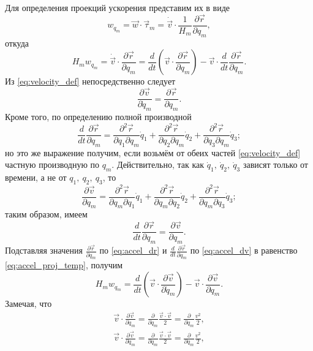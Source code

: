 \documentclass{article}
\theoremstyle{definition}
\theoremstyle{plain}
\theoremstyle{remark}
\numberwithin{equation}{section}
\newcommand{\paren}[1]{\left( #1 \right)}
\newcommand{\dotprod}[2]{#1 \cdot #2}
\newcommand{\der}[2][]{\frac{d #1}{d #2}}
\newcommand{\parder}[2][]{\frac{\partial #1}{\partial #2}}
\newcommand{\pparder}[3][]{\frac{\partial^2 #1}{\partial #2 \partial #3}}
\newcommand{\dt}[1][]{\der[#1]{t}}
\begin{document}
Для определения проекций ускорения представим их в виде
\begin{equation*}
  w_{q_m} = \dotprod{\vec{w}}{\vec{\tau}_m} =
    \dotprod{\dot{\vec{v}}}{\frac{1}{H_m}}{\parder[\vec{r}]{q_m}},
\end{equation*}
откуда
\begin{equation}
  \label{eq:accel_proj_temp}
  H_m w_{q_m} = \dotprod{\dot{\vec{v}}}{\parder[\vec{r}]{q_m}} =
    \dt \paren{\dotprod{\vec{v}}{\parder[\vec{r}]{q_m}}}
    - \dotprod{\vec{v}}{\dt \parder[\vec{r}]{q_m}}.
\end{equation}
Из \autoref{eq:velocity_def} непосредственно следует
\begin{equation}
  \label{eq:accel_dr}
  \parder[\vec{v}]{\dot{q}_m} = \parder[\vec{r}]{q_m}.
\end{equation}
Кроме того, по определению полной производной
\begin{equation*}
  \dt \parder[\vec{r}]{q_m} = \pparder[\vec{r}]{q_1}{q_m} \dot{q}_1 +
    \pparder[\vec{r}]{q_2}{q_m} \dot{q}_2 +
    \pparder[\vec{r}]{q_3}{q_m} \dot{q}_3;
\end{equation*}
но это же выражение получим, если возьмём от обеих частей
\autoref{eq:velocity_def} частную производную по $q_m$. Действительно, так как
$\dot{q}_1,~\dot{q}_2,~\dot{q}_3$ зависят только от времени, а не от
$q_1,~q_2,~q_3$, то
\begin{equation*}
  \parder[\vec{v}]{q_m} = \pparder[\vec{r}]{q_m}{q_1} \dot{q}_1 +
    \pparder[\vec{r}]{q_m}{q_2} \dot{q}_2 + \pparder[\vec{r}]{q_m}{q_3}
    \dot{q}_3;
\end{equation*}
таким образом, имеем
\begin{equation}
  \label{eq:accel_dv}
  \dt \parder[\vec{r}]{q_m} = \parder[\vec{v}]{q_m}.
\end{equation}
Подставляя значения $\parder[\vec{r}]{q_m}$ по \autoref{eq:accel_dr} и
$\dt \parder[\vec{r}]{q_m}$ по \autoref{eq:accel_dv} в равенство
\ref{eq:accel_proj_temp}, получим
\begin{equation}
  \label{eq:accel_proj_temp2}
  H_m w_{q_m} = \dt \paren{\dotprod{\vec{v}}{\parder[\vec{v}]{\dot{q}_m}}} -
    \dotprod{\vec{v}}{\parder[\vec{v}]{q_m}}.
\end{equation}
Замечая, что
\begin{equation*}
  \begin{gathered}
    \dotprod{\vec{v}}{\parder[\vec{v}]{\dot{q}_m}} =
      \parder{\dot{q}_m} \frac{\dotprod{\vec{v}}{\vec{v}}}{2} =
      \parder{\dot{q}_m} \frac{v^2}{2}, \\
    \dotprod{\vec{v}}{\parder[\vec{v}]{q_m}} =
      \parder{q_m} \frac{\dotprod{\vec{v}}{\vec{v}}}{2} =
      \parder{q_m} \frac{v^2}{2},
  \end{gathered}
\end{equation*}
\end{document}
